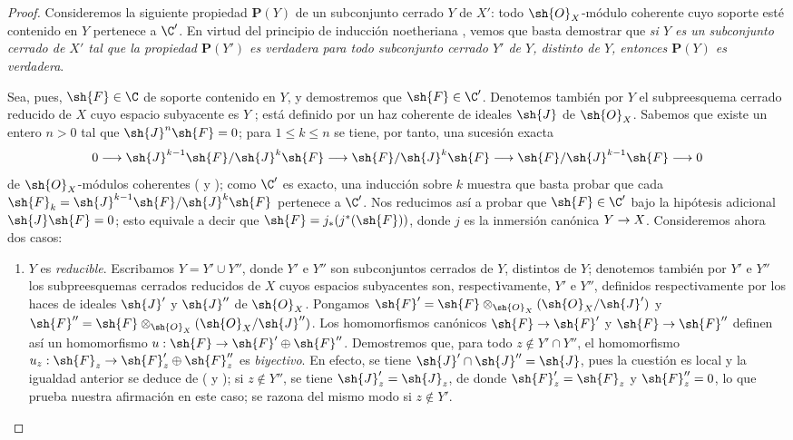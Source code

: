\documentclass[oneside]{amsart}
\makeatletter
\renewcommand{\leq}{\leqslant}
\newcommand{\ega@arrow}[2]{\mathchoice{#1}{#2}{#2}{#2}}
\renewcommand{\to}{\ega@arrow{\longrightarrow}{\rightarrow}}
\newcommand{\oldpage}[2][]{{\marginnote{\normalfont\textbf{#1}~|~#2}}\ignorespaces}
\makeatother
\begin{document}
\begin{proof}
Consideremos la siguiente propiedad $\textbf{P}(Y)$ de un subconjunto cerrado $Y$ de $X'$: todo $\sh{O}_X$-módulo coherente cuyo soporte esté contenido en $Y$ pertenece a $\C'$.
En virtud del principio de inducción noetheriana , vemos que basta demostrar que \emph{si $Y$ es un subconjunto cerrado de $X'$ tal que la propiedad $\textbf{P}(Y')$ es verdadera para todo subconjunto cerrado $Y'$ de $Y$, distinto de $Y$, entonces $\textbf{P}(Y)$ es verdadera}.

Sea, pues, $\sh{F}\in\C$ de soporte contenido en $Y$, y demostremos que $\sh{F}\in\C'$.
Denotemos también por $Y$ el subpreesquema cerrado reducido de $X$ cuyo espacio subyacente es $Y$ ; está definido por un haz coherente de ideales $\sh{J}$ de $\sh{O}_X$.
Sabemos  que existe un entero $n>0$ tal que $\sh{J}^n\sh{F}=0$; para $1\leq k\leq n$ se tiene, por tanto, una sucesión exacta
\[
  0\to\sh{J}^{k-1}\sh{F}/\sh{J}^k\sh{F}\to\sh{F}/\sh{J}^k\sh{F}\to\sh{F}/\sh{J}^{k-1}\sh{F}\to 0
\]
 de $\sh{O}_X$-módulos coherentes ( y ); como $\C'$ es exacto, una inducción sobre $k$ muestra que basta probar que cada $\sh{F}_k=\sh{J}^{k-1}\sh{F}/\sh{J}^k\sh{F}$ pertenece a $\C'$.
Nos reducimos así a probar que $\sh{F}\in\C'$ bajo la hipótesis adicional $\sh{J}\sh{F}=0$; esto equivale a decir que $\sh{F}=j_*(j^*(\sh{F}))$, donde $j$ es la inmersión canónica $Y\to X$.
Consideremos ahora dos casos:
\begin{enumerate}
  \item[\textit{(a)}] $Y$ es \emph{reducible}.
    Escribamos $Y=Y'\cup Y''$, donde $Y'$ e $Y''$ son subconjuntos cerrados de $Y$, distintos de $Y$; denotemos también por $Y'$ e $Y''$ los subpreesquemas cerrados reducidos de $X$ cuyos espacios subyacentes son, respectivamente, $Y'$ e $Y''$, definidos respectivamente por los haces de ideales $\sh{J}'$ y $\sh{J}''$ de $\sh{O}_X$.
    Pongamos $\sh{F}'=\sh{F}\otimes_{\sh{O}_X}(\sh{O}_X/\sh{J}')$ y $\sh{F}''=\sh{F}\otimes_{\sh{O}_X}(\sh{O}_X/\sh{J}'')$.
    Los homomorfismos canónicos $\sh{F}\to\sh{F}'$ y $\sh{F}\to\sh{F}''$ definen así un homomorfismo $u:\sh{F}\to\sh{F}'\oplus\sh{F}''$.
    Demostremos que, para todo $z\not\in Y'\cap Y''$, el homomorfismo $u_z:\sh{F}_z\to\sh{F}_z'\oplus\sh{F}_z''$ es \emph{biyectivo}.
    En efecto, se tiene $\sh{J}'\cap\sh{J}''=\sh{J}$, pues la cuestión es local y
\oldpage[III]{116}
    la igualdad anterior se deduce de ( y ); si $z\not\in Y''$, se tiene $\sh{J}_z'=\sh{J}_z$, de donde $\sh{F}_z'=\sh{F}_z$ y $\sh{F}_z''=0$, lo que prueba nuestra afirmación en este caso; se razona del mismo modo si $z\not\in Y'$.

\end{enumerate}
\end{proof}
\end{document}
